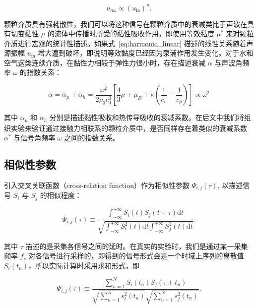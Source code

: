 \begin{equation}
  u_{n\omega} \propto \left(u_{\text{in}}\right)^{n}.\label{eq:harmonic_linear}
\end{equation}

颗粒介质具有强耗散性，我们可以将这种信号在颗粒介质中的衰减类比于声波在具有切变黏性 $\mu$ 的流体中传播时所受的黏性吸收作用，即使用等效黏度 $\mu^{*}$ 来对颗粒介质进行宏观的统计性描述。如果式~\eqref{eq:harmonic_linear} 描述的线性关系随着声源振幅 $u_{\text{in}}$ 增大遭到破坏，即说明等效黏度已经因为泵浦作用发生变化。对于水和空气这类连续介质，在黏性力相较于弹性力很小时，存在描述衰减 $\alpha$ 与声波角频率 $\omega$ 的指数关系：

\begin{equation}
  \alpha = \alpha_{\mu} + \alpha_{h} = \frac{\omega^{2}}{2\rho_{0}c_{0}^{3}}\left[\frac{4}{3}\mu + \mu_{B} + \kappa\left(\frac{1}{c_{v}} - \frac{1}{c_{p}}\right)\right]\propto \omega^{2}
\end{equation}

其中 $\alpha_{\mu}$ 和 $\alpha_{h}$ 分别是描述黏性吸收和热传导吸收的衰减系数。在后文中我们将组织实验来验证通过接触力相联系的颗粒介质中，是否同样存在着类似的衰减系数 $\alpha^{*}$ 与信号角频率 $\omega$ 之间的指数关系。

\subsection{相似性参数}

引入交叉关联函数（cross-relation function）作为相似性参数 $\Psi_{i,j}(\tau)$, 以描述信号 $S_{i}$ 与 $S_{j}$ 的相似程度\cite{PhysRevLett.90.174302}：

\begin{equation}
  \Psi_{i,j}(\tau) \equiv \frac{\int_{-\infty}^{+\infty}S_{i}(t)S_{j}(t+\tau)\mathrm{d}t}{\sqrt{\int_{-\infty}^{+\infty}S_{i}^{2}(t)\mathrm{d}t\int_{-\infty}^{+\infty}S_{j}^{2}(t)\mathrm{d}t}}.
\end{equation}

其中 $\tau$ 描述的是采集各信号之间的延时。在真实的实验时，我们是通过某一采集频率 $f_{s}$ 对各信号进行采样的，即得到的信号形式会是一个时域上序列的离散值 $S_{i}(t_{n})$，所以实际计算时采用求和形式，即

\begin{equation}
  \Psi_{i,j}(\tau)\equiv \frac{\sum_{n=1}^{N}S_{i}(t_{n})S_{j}(\tau+t_{n})}{\sqrt{\sum_{n=1}^{N}s_{i}^{2}(t_{n})}\sqrt{\sum_{n=1}^{N}s_{j}^{2}(t_{n})}}.
\end{equation}

